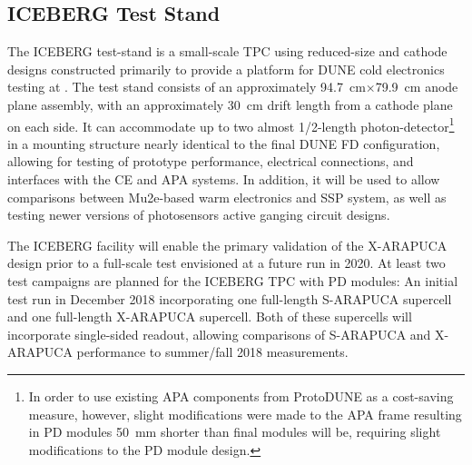 % 

\subsection{ICEBERG Test Stand}
\label{sec:iceberg-teststand}

The ICEBERG test-stand is a small-scale TPC using reduced-size   and cathode designs constructed primarily to provide a platform for DUNE cold electronics testing at . 
The test stand consists of an approximately \SI{94.7}{cm}$\times$\SI{79.9}{cm} anode plane assembly, with an approximately \SI{30}{cm} drift length from a cathode plane on each side.  
It can accommodate up to two almost 1/2-length photon-detector\footnote{In order to use existing APA components from ProtoDUNE as a cost-saving measure, however, slight modifications were made to the APA frame resulting in PD modules \SI{50}{mm} shorter than final modules will be, requiring slight modifications to the PD module design.} in a mounting structure nearly identical to the final DUNE FD configuration, allowing for testing of  prototype performance, electrical connections, and interfaces with the CE and APA systems. 
In addition, it will be used to allow comparisons between Mu2e-based warm electronics and  SSP system, as well as testing newer versions of photosensors active ganging circuit designs.


The ICEBERG facility will enable the primary validation of the X-ARAPUCA design prior to a full-scale test envisioned at a future  run in 2020. 
At least two test campaigns are planned for the ICEBERG TPC with PD modules:  An initial test run in December 2018 incorporating one full-length S-ARAPUCA supercell and one full-length X-ARAPUCA supercell.  Both of these supercells will incorporate single-sided readout, allowing comparisons of S-ARAPUCA and X-ARAPUCA performance to summer/fall 2018  measurements.

